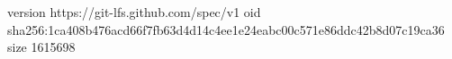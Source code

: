 version https://git-lfs.github.com/spec/v1
oid sha256:1ca408b476acd66f7fb63d4d14c4ee1e24eabc00c571e86ddc42b8d07c19ca36
size 1615698
